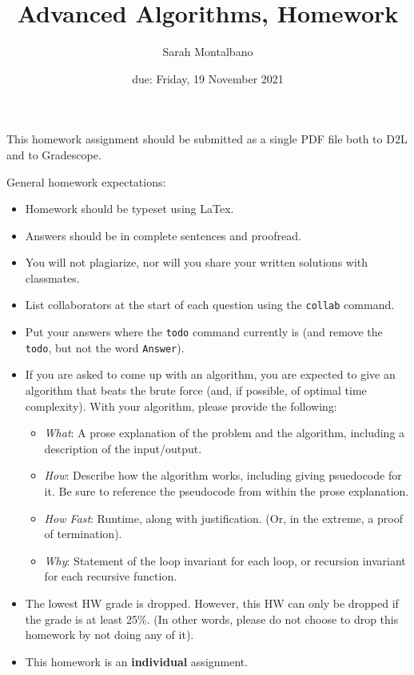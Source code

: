 \documentclass{article}
\title{Advanced Algorithms, Homework \hwnum}
\author{Sarah Montalbano}
\date{due: Friday, 19 November 2021}
\begin{document}
\maketitle

This homework assignment should be
submitted as a single PDF file both to D2L and to Gradescope.

General homework expectations:
\begin{itemize}
    \item Homework should be typeset using LaTex.
    \item Answers should be in complete sentences and proofread.
    \item You will not plagiarize, nor will you share your written solutions
        with classmates.
    \item List collaborators at the start of each question using the
        \texttt{collab} command.
    \item Put your answers where the \texttt{todo} command currently is (and
        remove the \texttt{todo}, but not the word \texttt{Answer}).
    \item If you are asked to come up with an algorithm, you are
        expected to give an algorithm that beats the brute force (and, if possible, of
        optimal time complexity). With your algorithm, please provide the following:
        \begin{itemize}
            \item \emph{What}: A prose explanation of the problem and the algorithm,
                including a description of the input/output.
            \item \emph{How}: Describe how the algorithm works, including giving
                psuedocode for it.  Be sure to reference the pseudocode
                from within the prose explanation.
            \item \emph{How Fast}: Runtime, along with justification.  (Or, in the
                extreme, a proof of termination).
            \item \emph{Why}: Statement of the loop invariant for each loop, or
                recursion invariant for each recursive function.
        \end{itemize}
    \item The lowest HW grade is dropped.  However, this HW can only be dropped
        if the grade is at least 25\%.  (In other words, please do not choose to
        drop this homework by not doing any of it).
    \item This homework is an \textbf{individual} assignment.
\end{itemize}
\end{document}
